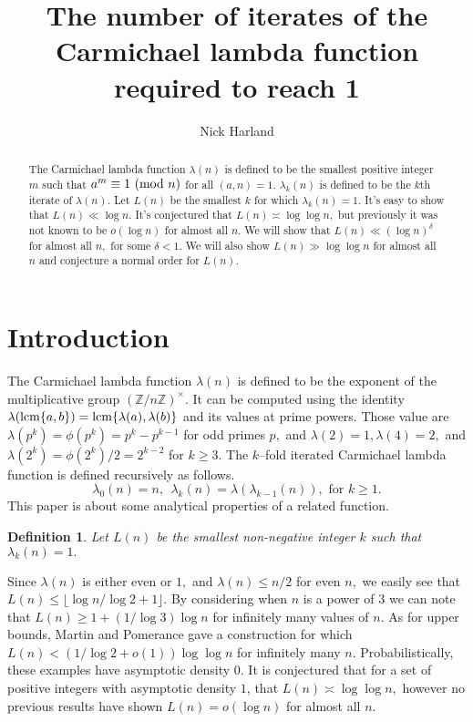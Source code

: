 \documentclass[12pt,regno]{amsart}
\title{The number of iterates of the Carmichael lambda function required to reach 1}
\author{Nick Harland}
\newtheorem{definition}[theorem]{Definition}
\begin{document}
\begin{abstract}
The Carmichael lambda function $\lambda(n)$ is defined to be the smallest positive integer $m$ such that $a^m \equiv 1 {{\ifmmode\text{\rm\ (mod~${n}$)}\else\discretionary{}{}{\hbox{ }}\rm(mod~${n}$)\fi}}$ for all $(a,n)=1.$ $\lambda_k(n)$ is defined to be the $k$th iterate of $\lambda(n).$ Let $L(n)$ be the smallest  $k$ for which $\lambda_k(n)=1.$ It's easy to show that $L(n) \ll \log n.$ It's conjectured that $L(n)\asymp \log\log n,$ but previously it was not known to be $o(\log n)$ for almost all $n.$ We will show that $L(n) \ll (\log n)^{\delta}$ for almost all $n,$ for some $\delta <1.$ We will also show $L(n) \gg \log\log n$ for almost all $n$  and conjecture a normal order for $L(n).$ 
\end{abstract}
\maketitle

\section{Introduction}\label{Intro}

The Carmichael lambda function $\lambda(n)$ is defined to be the exponent of the multiplicative group $({\mathbb{Z}} / n{\mathbb{Z}})^{\times}.$ It can be computed using the identity $\lambda({\mathop{\rm lcm }}\{a,b\})={\mathop{\rm lcm }}\{\lambda(a),\lambda(b)\}$ and its values at prime powers. Those value are $\lambda(p^{k})=\phi(p^{k})=p^k-p^{k-1}$ for odd primes $p,$ and $\lambda(2)=1,\lambda(4)=2,$ and $\lambda(2^{k})=\phi(2^{k})/2=2^{k-2}$ for $k \ge 3$. The $k$--fold iterated Carmichael lambda function is defined recursively as follows.
$$\lambda_0(n)=n,~~\lambda_k(n)=\lambda(\lambda_{k-1}(n)), \text{ for } k \ge 1.$$ This paper is about some analytical properties of a related function.
\begin{definition}
Let $L(n)$ be the smallest non-negative integer $k$ such that $\lambda_k(n)=1.$
\end{definition}
Since $\lambda(n)$ is either even or $1,$ and $\lambda(n) \le n/2 $ for even $n,$ we easily see that $L(n)\le \lfloor\log n/\log 2+1\rfloor.$ By considering when $n$ is a power of $3$ we can note that $L(n)\ge 1+ (1/\log 3)\log n$ for infinitely many values of $n.$ As for upper bounds, Martin and Pomerance \cite{MP} gave a construction for which $L(n) < (1/\log 2 +o(1))\log\log n$ for infinitely many $n.$ Probabilistically, these examples have asymptotic density $0.$ It is conjectured that for a set of positive integers with asymptotic density $1$, that $L(n)\asymp \log\log n,$ however no previous results have shown $L(n)=o(\log n)$ for almost all $n.$
\end{document}
